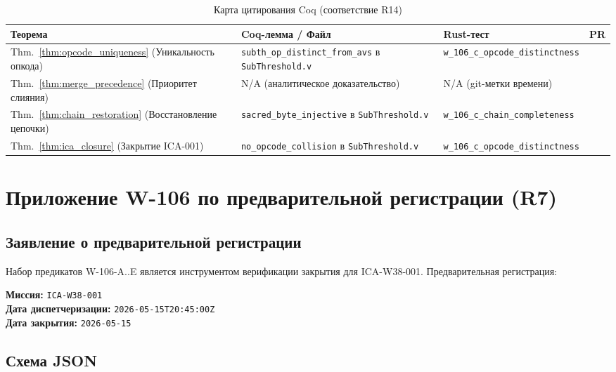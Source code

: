 \begin{table}[ht]
\centering
\caption{Карта цитирования Coq (соответствие R14)}
\label{tab:coq_citation_map}
\begin{tabular}{p{3.5cm}p{3.5cm}p{3.5cm}p{2cm}}
\hline
Теорема & Coq-лемма / Файл & Rust-тест & PR \\
\hline
Thm.~\ref{thm:opcode_uniqueness} (Уникальность опкода) &
  \texttt{subth\_op\_distinct\_from\_avs} в
  \texttt{SubThreshold.v} &
  \texttt{w\_106\_c\_opcode\_distinctness} &
  \cite{pr661_t27} \\
Thm.~\ref{thm:merge_precedence} (Приоритет слияния) &
  N/A (аналитическое доказательство) &
  N/A (git-метки времени) &
  \cite{pr655_t27,pr660_t27} \\
Thm.~\ref{thm:chain_restoration} (Восстановление цепочки) &
  \texttt{sacred\_byte\_injective} в
  \texttt{SubThreshold.v} &
  \texttt{w\_106\_c\_chain\_completeness} &
  \cite{pr661_t27} \\
Thm.~\ref{thm:ica_closure} (Закрытие ICA-001) &
  \texttt{no\_opcode\_collision} в
  \texttt{SubThreshold.v} &
  \texttt{w\_106\_c\_opcode\_distinctness} &
  \cite{pr661_t27,pr_tt25,pr_tt26} \\
\hline
\end{tabular}
\end{table}

\section{Приложение W-106 по предварительной регистрации (R7)}
\label{sec:falsification_appendix}

\subsection{Заявление о предварительной регистрации}

Набор предикатов W-106-A..E является инструментом верификации закрытия
для ICA-W38-001.  Предварительная регистрация:

\textbf{Миссия:} \texttt{ICA-W38-001} \\
\textbf{Дата диспетчеризации:} \texttt{2026-05-15T20:45:00Z} \\
\textbf{Дата закрытия:} \texttt{2026-05-15}

\subsection{Схема JSON}

